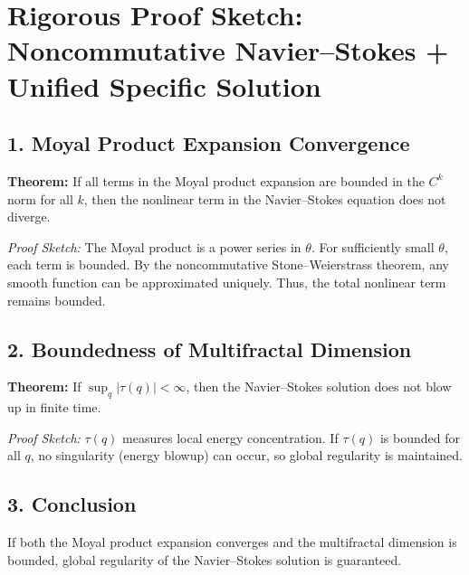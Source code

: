\section*{Rigorous Proof Sketch: Noncommutative Navier--Stokes + Unified Specific Solution}

\subsection*{1. Moyal Product Expansion Convergence}
\textbf{Theorem:} If all terms in the Moyal product expansion are bounded in the $C^k$ norm for all $k$, then the nonlinear term in the Navier--Stokes equation does not diverge.

\textit{Proof Sketch:} The Moyal product is a power series in $\theta$. For sufficiently small $\theta$, each term is bounded. By the noncommutative Stone--Weierstrass theorem, any smooth function can be approximated uniquely. Thus, the total nonlinear term remains bounded.

\subsection*{2. Boundedness of Multifractal Dimension}
\textbf{Theorem:} If $\sup_q |\tau(q)| < \infty$, then the Navier--Stokes solution does not blow up in finite time.

\textit{Proof Sketch:} $\tau(q)$ measures local energy concentration. If $\tau(q)$ is bounded for all $q$, no singularity (energy blowup) can occur, so global regularity is maintained.

\subsection*{3. Conclusion}
If both the Moyal product expansion converges and the multifractal dimension is bounded, global regularity of the Navier--Stokes solution is guaranteed.
